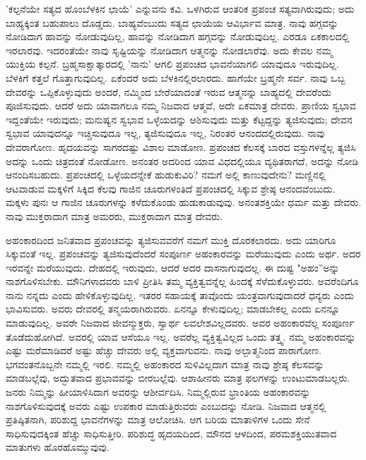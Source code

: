 'ಕಲ್ಪನೆಯೇ ಸತ್ಯದ ಹೊಂಬೆಳಕಿನ ಛಾಯೆ' ಎನ್ನುವನು ಕವಿ. ಒಳಗಿರುವ ಆಂತರಿಕ ಪ್ರಪಂಚ ಸತ್ಯವಾಗಿರುವುದು; ಅದು ಬಾಹ್ಯಕ್ಕಿಂತ ಬಹುಪಾಲು ದೊಡ್ಡದು. ಬಾಹ್ಯವೆಂಬುದು ಸತ್ಯದ ಛಾಯೆಯ ಆವಿರ್ಭಾವ ಮಾತ್ರ. ನಾವು ಹಗ್ಗವನ್ನು ನೋಡಿದಾಗ ಹಾವನ್ನು ನೋಡುವುದಿಲ್ಲ, ಹಾವನ್ನು ನೋಡಿದಾಗ ಹಗ್ಗವನ್ನು ನೋಡುವುದಿಲ್ಲ. ಎರಡೂ ಏಕಕಾಲದಲ್ಲಿ ಇರಲಾರವು. ಇದರಂತೆಯೇ ನಾವು ಸೃಷ್ಟಿಯನ್ನು ನೋಡಿದಾಗ ಆತ್ಮನನ್ನು ನೋಡಲಾರೆವು. ಅದು ಕೇವಲ ನಮ್ಮ ಯುಕ್ತಿಯ ಕಲ್ಪನೆ. ಬ್ರಹ್ಮಸಾಕ್ಷಾತ್ಕಾರದಲ್ಲಿ 'ನಾನು' ಆಗಲಿ ಪ್ರಪಂಚದ ಭಾವನೆಯಾಗಲಿ ಯಾವುದೂ ಇರುವುದಿಲ್ಲ. ಬೆಳಕಿಗೆ ಕತ್ತಲೆ ಗೊತ್ತಾಗುವುದಿಲ್ಲ. ಏಕೆಂದರೆ ಅದು ಬೆಳಕಿನಲ್ಲಿರಲಾರದು. ಹಾಗೆಯೇ ಬ್ರಹ್ಮನೇ ಸರ್ವ. ನಾವು ಒಬ್ಬ ದೇವರನ್ನು ಒಪ್ಪಿಕೊಳ್ಳುವುದು ಅಂದರೆ, ನಮ್ಮಿಂದ ಬೇರೆಯಾದಂತೆ ಇರುವ ಆತ್ಮನನ್ನು ಬಾಹ್ಯದಲ್ಲಿ ದೇವರೆಂದು ಪೂಜಿಸುವುದು. ಆದರೆ ಅದು ಯಾವಾಗಲೂ ನಮ್ಮ ನಿಜವಾದ ಆತ್ಮವೆ, ಅದೇ ಏಕಮಾತ್ರ ದೇವರು. ಪ್ರಾಣಿಯ ಸ್ವಭಾವ ಇದ್ದಂತೆಯೇ ಇರುವುದು; ಮನುಷ್ಯನ ಸ್ವಭಾವ ಒಳ್ಳೆಯದನ್ನು ಆಶಿಸುವುದು ಮತ್ತು ಕೆಟ್ಟದ್ದನ್ನು ತ್ಯಜಿಸುವುದು; ದೇವನ ಸ್ವಭಾವ ಯಾವುದನ್ನೂ ಇಚ್ಚಿಸುವುದೂ ಇಲ್ಲ, ತ್ಯಜಿಸುವುದೂ ಇಲ್ಲ, ನಿರಂತರ ಆನಂದದಲ್ಲಿರುವುದು. ನಾವು ದೇವರಾಗೋಣ. ಹೃದಯವನ್ನು ಸಾಗರದಷ್ಟು ವಿಶಾಲ ಮಾಡೋಣ. ಪ್ರಪಂಚದ ಕೆಲಸಕ್ಕೆ ಬಾರದ ವಸ್ತುಗಳನ್ನೆಲ್ಲ ತ್ಯಜಿಸಿ ಅದನ್ನು ಒಂದು ಚಿತ್ರದಂತೆ ನೋಡೋಣ. ಅನಂತರ ಅದರಿಂದ ಯಾವ ವಿಧದಲ್ಲಿಯೂ ವ್ಯಥಿತರಾಗದೆ, ಅದನ್ನು ನೋಡಿ ಆನಂದಿಸಬಹುದು. ಪ್ರಪಂಚದಲ್ಲಿ ಒಳ್ಳೆಯದನ್ನೇಕೆ ಹುಡುಕುವಿರಿ? ನಮಗೆ ಅಲ್ಲಿ ಕಾಣುವುದೇನು? ಮಣ್ಣಿನಲ್ಲಿ ಆಟವಾಡುವ ಮಕ್ಕಳಿಗೆ ಸಿಕ್ಕಿದ ಕೆಲವು ಗಾಜಿನ ಚೂರುಗಳಂತಿದೆ ಪ್ರಪಂಚದಲ್ಲಿ ಸಿಕ್ಕುವ ಶ್ರೇಷ್ಠ ಆನಂದವೆಂಬುದು. ಮಕ್ಕಳು ಪುನಃ ಆ ಗಾಜಿನ ಚೂರುಗಳನ್ನು ಕಳೆದುಕೊಂಡು ಹುಡುಕಾಡುವುವು. ಅನಂತಶಕ್ತಿಯೇ ಧರ್ಮ ಮತ್ತು ದೇವರು. ನಾವು ಮುಕ್ತರಾದಾಗ ಮಾತ್ರ ಅಮರರು, ಮುಕ್ತರಾದಾಗ ಮಾತ್ರ ದೇವರು.

ಅಹಂಕಾರದಿಂದ ಜನಿತವಾದ ಪ್ರಪಂಚವನ್ನು ತ್ಯಜಿಸುವವರೆಗೆ ನಮಗೆ ಮುಕ್ತಿ ದೊರಕಲಾರದು. ಅದು ಯಾರಿಗೂ ಸಿಕ್ಕುವಂತೆ ಇಲ್ಲ. ಪ್ರಪಂಚವನ್ನು ತ್ಯಜಿಸುವುದೆಂದರೆ ಸಂಪೂರ್ಣ ಅಹಂಕಾರವನ್ನು ಮರೆಯುವುದು ಎಂದು ಅರ್ಥ. ಅದರ ಇರವನ್ನೇ ಮರೆಯುವುದು. ದೇಹದಲ್ಲಿ ಇರುವುದು, ಆದರೆ ಅದರ ದಾಸನಾಗುವುದಲ್ಲ. ಈ ದುಷ್ಟ "ಅಹಂ''ಅನ್ನು ನಾಶಗೊಳಿಸಬೇಕು. ಮೌನಿಗಳಾದವರು ಬಾಳಿ ಪ್ರೀತಿಸಿ ತಮ್ಮ ವ್ಯಕ್ತಿತ್ವವನ್ನೆಲ್ಲ ಹಿಂದಕ್ಕೆ ಸೆಳೆದುಕೊಳ್ಳುವರು. ಅವರೆಂದಿಗೂ ನಾನು ನನ್ನದು ಎಂದು ಹೇಳಿಕೊಳ್ಳುವುದಿಲ್ಲ. ಇತರರ ಸಹಾಯಕ್ಕೆ ತಾವೊಂದು ಯಂತ್ರವಾಗುವುದಾದರೆ ಧನ್ಯರು ಎಂದು ಭಾವಿಸುವರು. ಅವರು ದೇವರಲ್ಲಿ ತನ್ಮಯರಾಗಿರುವರು. ಏನನ್ನೂ ಕೇಳುವುದಿಲ್ಲ; ಮಾಡಬೇಕಲ್ಲ ಎಂದು ಏನನ್ನೂ ಮಾಡುವುದಿಲ್ಲ. ಅವರೇ ನಿಜವಾದ ಜೀವನ್ಮುಕ್ತರು, ಸ್ವಾರ್ಥ ಲವಲೇಶವಿಲ್ಲದವರು. ಅವರ ಅಹಂಕಾರವೆಲ್ಲ ಸಂಪೂರ್ಣ ತೊಡೆದುಹೋಗಿದೆ. ಅವರಲ್ಲಿ ಯಾವ ಆಸೆಯೂ ಇಲ್ಲ. ಅವರೆಲ್ಲ ವ್ಯಕ್ತಿತ್ವವಿಲ್ಲದ ಒಂದು ತತ್ತ್ವ. ನಮ್ಮ ಅಹಂಕಾರವನ್ನು ಎಷ್ಟು ಮರೆಮಾಡಿದರೆ ಅಷ್ಟು ಹೆಚ್ಚು ದೇವರು ಅಲ್ಲಿ ವ್ಯಕ್ತವಾಗುವನು. ನಾವು ಅಲ್ಪಾತ್ಮನಿಂದ ಪಾರಾಗೋಣ. ಭಗವಂತನೊಬ್ಬನೇ ನಮ್ಮಲ್ಲಿ ಇರಲಿ. ನಮ್ಮಲ್ಲಿ ಅಹಂಕಾರದ ಸುಳಿವಿಲ್ಲದಾಗ ಮಾತ್ರ ನಾವು ಶ್ರೇಷ್ಠ ಕೆಲಸವನ್ನು ಮಾಡಬಲ್ಲೆವು, ಅದ್ಭುತವಾದ ಪ್ರಭಾವವನ್ನು ಬೀರಬಲ್ಲೆವು. ಆಶಾಹೀನರು ಮಾತ್ರ ಫಲಗಳನ್ನು ಉಂಟುಮಾಡಬಲ್ಲರು. ಜನರು ನಿಮ್ಮನ್ನು ಹೀಯಾಳಿಸಿದಾಗ ಅವರನ್ನು ಆಶೀರ್ವದಿಸಿ. ನಿಮ್ಮಲ್ಲಿರುವ ಭ್ರಾಂತಿಯ ಅಹಂಕಾರವನ್ನು ನಾಶಗೊಳಿಸುವುದಕ್ಕೆ ಅವರು ಎಷ್ಟು ಉಪಕಾರ ಮಾಡುತ್ತಿರುವರು ಎಂಬುದನ್ನು ನೋಡಿ. ನಿಜವಾದ ಆತ್ಮನಲ್ಲಿ ಪ್ರತಿಷ್ಠಿತನಾಗಿ, ಪರಿಶುದ್ದ ಭಾವನೆಗಳನ್ನು ಮಾತ್ರ ಆಲೋಚಿಸಿ. ಆಗ ಬರಿಯ ಮಾತಾಳಿಗಳ ಒಂದು ಸೇನೆ ಸಾಧಿಸುವುದಕ್ಕಿಂತ ಹೆಚ್ಚು ಸಾಧಿಸುತ್ತೀರಿ. ಪರಿಶುದ್ಧ ಹೃದಯದಿಂದ, ಮೌನದ ಆಳದಿಂದ, ಪರಮಶಕ್ತಿಯುತವಾದ ಮಾತುಗಳು ಹೊರಹೊಮ್ಮುವುವು.

